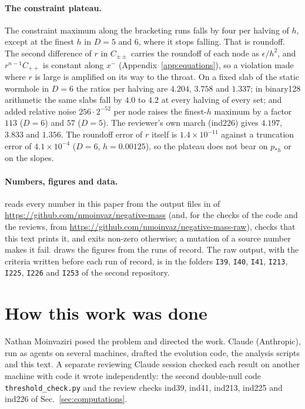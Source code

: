 \documentclass[11pt]{article}
\newcommand{\pst}{p_{*h}}
\begin{document}
\paragraph{The constraint plateau.} The constraint maximum along the bracketing runs falls by four per halving of $h$,
except at the finest $h$ in $D=5$ and $6$, where it stops falling. That is roundoff. The second difference of $r$ in
$C_{\pm\pm}$ carries the roundoff of each node as $\epsilon/h^2$, and $r^{n-1}C_{++}$ is constant along $x^-$
(Appendix~\ref{app:equations}), so a violation made where $r$ is large is amplified on its way to the throat. On a
fixed slab of the static wormhole in $D=6$ the ratios per halving are $4.204$, $3.758$ and $1.337$; in binary128
arithmetic the same slabs fall by $4.0$ to $4.2$ at every halving of every set; and added relative noise
$256\cdot2^{-52}$ per node raises the finest-$h$ maximum by a factor $113$ ($D=6$) and $57$ ($D=5$). The reviewer's own march (ind226) gives $4.197$,
$3.833$ and $1.356$. The roundoff error of $r$ itself is $1.4\times10^{-11}$ against a truncation error of
$4.1\times10^{-4}$ ($D=6$, $h=0.00125$), so the plateau does not bear on $\pst$ or on the slopes.

\paragraph{Numbers, figures and data.}  reads every number in this
paper from the output files in  of \url{https://github.com/nmoinvaz/negative-mass} (and,
for the checks of the code and the reviews, from \url{https://github.com/nmoinvaz/negative-mass-raw}), checks that this
text prints it, and exits non-zero otherwise; a mutation of a source number makes it fail.
 draws the figures from the runs of record. The raw output, with the
criteria written before each run of record, is in the folders \texttt{I39}, \texttt{I40}, \texttt{I41}, \texttt{I213},
\texttt{I225}, \texttt{I226} and \texttt{I253} of the second repository.

\section*{How this work was done}

Nathan Moinvaziri posed the problem and directed the work. Claude (Anthropic), run as agents on several machines,
drafted the evolution code, the analysis scripts and this text. A separate reviewing Claude session checked each result
on another machine with code it wrote independently: the second double-null code \texttt{threshold\_check.py} and the
review checks ind39, ind41, ind213, ind225 and ind226 of Sec.~\ref{sec:computations}.
\end{document}
